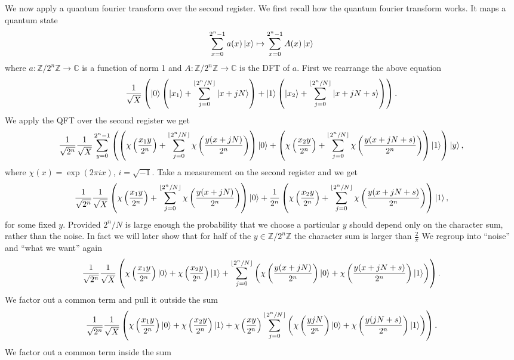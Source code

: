 \documentclass[10pt]{article}
\theoremstyle{plain}
\theoremstyle{definition}
\newcommand{\Z}{\mathbb{Z}}
\newcommand{\C}{\mathbb{C}}
\begin{document}
We now apply a quantum fourier transform over the second register.
We first recall how the quantum fourier transform works.
It maps a quantum state
\[
    \sum_{x=0}^{2^n-1} a(x)\ket{x} \mapsto \sum_{x=0}^{2^n-1} A(x)\ket{x}
\]
where \( a: \Z / 2^n \Z \to \C \) is a function of norm 1 and \( A : \Z / 2^n \Z \to \C\) is the DFT of \( a \).
First we rearrange the above equation
\[
    \frac{1}{\sqrt{X}} \left(\ket{0}\left(\ket{x_1} + \sum_{j=0}^{\lfloor 2^n / N \rfloor }\ket{x + jN} \right) + \ket{1} \left(\ket{x_2} + \sum_{j=0}^{\lfloor 2^n / N \rfloor }\ket{x + jN + s}\right) \right) .
\]
We apply the QFT over the second register we get
\[
    \frac{1}{\sqrt{2^n}}\frac{1}{\sqrt{X}}\sum_{y = 0}^{2^n - 1} \left(  \left(\chi\left(\frac{x_1y}{ 2^n}\right) + \sum_{j = 0}^{\lfloor 2^n / N \rfloor } \chi\left(\frac{y(x+jN)}{2^n}\right) \right) \ket{0}  +  \left( \chi\left(\frac{x_2y}{ 2^n}\right) + \sum_{j = 0}^{\lfloor 2^n / N \rfloor } \chi\left(\frac{y(x+jN + s)}{2^n}\right)\right) \ket{1} \right)\ket{y} ,
\]
where \( \chi(x) = \exp(2\pi ix) \), \( i = \sqrt{-1} \).
Take a measurement on the second register and we get
\[
    \frac{1}{\sqrt{2^n}}\frac{1}{\sqrt{X}}\left(\chi\left(\frac{x_1y}{ 2^n}\right) + \sum_{j = 0}^{\lfloor 2^n / N \rfloor } \chi\left(\frac{y(x+jN)}{2^n}\right) \right) \ket{0}  +  \frac{1}{2^n}\left( \chi\left(\frac{x_2y}{ 2^n}\right) + \sum_{j = 0}^{\lfloor 2^n / N \rfloor } \chi\left(\frac{y(x+jN + s)}{2^n}\right)\right) \ket{1} ,
\]
for some fixed \( y \).
Provided \( 2^n / N \) is large enough the probability that we choose a particular \( y \) should depend only on the character sum, rather than the noise.
In fact we will later show that for half of the \( y \in \Z / 2^n \Z \) the character sum is larger than \( \frac{2}{\pi} \)
We regroup into ``noise'' and ``what we want'' again
\[
    \frac{1}{\sqrt{2^n}}\frac{1}{\sqrt{X}}
    \left(
    \chi\left(\frac{x_1y}{ 2^n}\right)\ket{0}
    + \chi\left(\frac{x_2y}{ 2^n}\right) \ket{1}
    + \sum_{j = 0}^{\lfloor 2^n / N \rfloor }
    \left(
        \chi\left(\frac{y(x+jN)}{2^n}\right) \ket{0}
        + \chi\left(\frac{y(x+jN + s)}{2^n}\right)\ket{1}
        \right)
    \right).
\]
We factor out a common term and pull it outside the sum
\[
    \frac{1}{\sqrt{2^n}}\frac{1}{\sqrt{X}} \left(\chi\left(\frac{x_1y}{ 2^n}\right)\ket{0} + \chi\left(\frac{x_2y}{ 2^n}\right) \ket{1} + \chi\left(\frac{xy}{2^n}\right)\sum_{j = 0}^{\lfloor 2^n / N \rfloor } \left(\chi\left(\frac{yjN}{2^n}\right) \ket{0}  +    \chi\left(\frac{y(jN + s)}{2^n}\right)  \ket{1}\right)\right).
\]
We factor out a common term inside the sum
\end{document}
